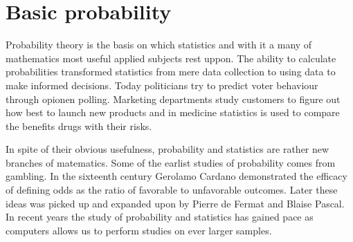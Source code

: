 \chapter{Basic probability}

Probability theory is the basis on which statistics and with it a many of mathematics most useful applied subjects rest uppon. The ability to calculate probabilities transformed statistics from mere data collection to using data to make informed decisions. Today politicians try to predict voter behaviour through opionen polling. Marketing departments study customers to figure out how best to launch new products and in medicine statistics is used to compare the benefits drugs with their risks.

\myindent In spite of their obvious usefulness, probability and statistics are rather new branches of matematics. Some of the earlist studies of probability comes from gambling. In the sixteenth century Gerolamo Cardano demonstrated the efficacy of defining odds as the ratio of favorable to unfavorable outcomes. Later these ideas was picked up and expanded upon by Pierre de Fermat and Blaise Pascal. In recent years the study of probability and statistics has gained pace as computers allows us to perform studies on ever larger samples.

